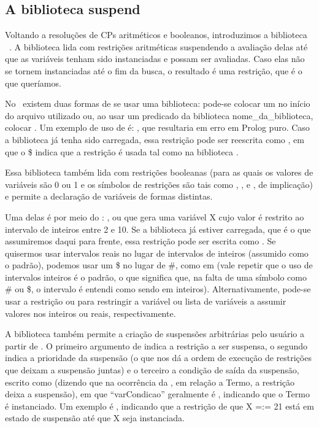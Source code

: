 \documentclass{article}
\begin{document}
\subsection{A biblioteca suspend}

Voltando a resoluções de CPs aritméticos e booleanos, introduzimos a biblioteca \eclipse\ . A biblioteca  lida com restrições aritméticas suspendendo a avaliação delas até que as variáveis tenham sido instanciadas e possam ser avaliadas. Caso elas não se tornem instanciadas até o fim da busca, o resultado é uma restrição, que é o que queríamos.

No \eclipse\ existem duas formas de se usar uma biblioteca: pode-se colocar um  no início do arquivo utilizado ou, ao usar um predicado da biblioteca nome\_da\_biblioteca, colocar . Um exemplo de uso de  é: , que resultaria em erro em Prolog puro. Caso a biblioteca  já tenha sido carregada, essa restrição pode ser reescrita como ,
em que o \$ indica que a restrição é usada tal como na biblioteca .

Essa biblioteca também lida com restrições booleanas (para as quais os valores de variáveis são 0 ou
1 e os símbolos de restrições são tais como , ,  e
, de implicação) e permite a declaração de variáveis de formas distintas.

Uma delas é por meio do : , ou 
que gera uma variável X cujo valor é restrito ao intervalo de inteiros entre 2 e 10. Se a biblioteca já estiver carregada, que é o que assumiremos daqui para frente, essa restrição pode ser escrita como .
Se quisermos usar intervalos reais no lugar de intervalos de inteiros (assumido como o padrão),
podemos usar um \$ no lugar de \#, como em  (vale repetir que o uso de
intervalos inteiros é o padrão, o que significa que, na falta de uma símbolo como  \# ou \$, o
intervalo é entendi como sendo em inteiros).
Alternativamente, pode-se usar a restrição  ou  para restringir a variável ou lista de variáveis a assumir valores nos inteiros ou reais, respectivamente.



A biblioteca  também permite a criação de suspensões arbitrárias pelo usuário a
partir de . O primeiro argumento de  indica a restrição a ser
suspensa, o segundo indica a prioridade da suspensão (o que nos dá a ordem de execução de restrições
que deixam a suspensão juntas) e o terceiro a condição de saída da suspensão, escrito como
 (dizendo que na ocorrência da , em relação a Termo, a restrição deixa a suspensão), em que
``var{Condicao}'' geralmente é , indicando que o Termo é instanciado.
Um exemplo é , indicando que a restrição de que X =:= 21 está em estado de suspensão até que X seja instanciada.
\end{document}
